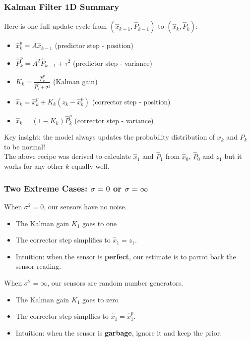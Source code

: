 \documentclass{beamer}
\newcommand{\xh}{\hat{x}}
\newcommand{\Ph}{\hat{P}}
\begin{document}
\begin{frame}
\frametitle{Kalman Filter 1D Summary}
Here is one full update cycle from $(\xh_{k-1},\Ph_{k-1})$ to $(\xh_{k}, \Ph_{k})$:
\begin{itemize}
\item $\xh_{k}^p =  A \xh_{k-1} $ \hspace{4.8em} (predictor step - position)
\item $\Ph_{k}^p = A^2 \Ph_{k-1} + \tau^2 $ \hspace{1.8em} (predictor step - variance)
\item $K_{k} = \frac{\hat P_{k}^p}{\hat P_{k}^p + \sigma^2}$ \hspace{4.6em} (Kalman gain)
\item $\xh_{k} = \xh_{k}^p + K_{k} (z_{k} - \xh_{k}^p)$ \hspace{0.5em}(corrector step - position)
\item $\xh_{k} = (1-K_{k}) \Ph_{k}^p$ \hspace{3.0em}(corrector step - variance)
\end{itemize}

Key insight: the model always updates the probability distribution of $x_k$ and $P_k$ to be normal!\\

The above recipe was derived to calculate $\xh_{1}$ and $\Ph_{1}$ from $\xh_{0}$, $\Ph_{0}$ and $z_{1}$ 
but it works for any other $k$ equally well.
\end{frame}

\begin{frame}
\frametitle{Two Extreme Cases: $\sigma=0$ or $\sigma=\infty$}
When $\sigma^2=0$, our sensors have no noise.
\begin{itemize}
\item The Kalman gain $K_1$ goes to one 
\item The corrector step simplifies to $\xh_1=z_1$.
\item Intuition: when the sensor is \textbf{perfect}, our estimate is to parrot back the sensor reading.
\end{itemize}

When $\sigma^2=\infty$, our sensors are random number generators.
\begin{itemize}
\item The Kalman gain $K_1$ goes to zero 
\item The corrector step simplfies to $\xh_1=\xh^p_1$.
\item Intuition: when the sensor is \textbf{garbage}, ignore it and keep the prior.
\end{itemize}

\end{frame}
\end{document}
